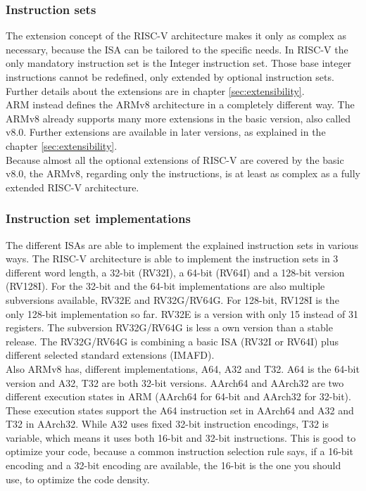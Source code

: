 \documentclass[conference]{IEEEtran}
\begin{document}
	\subsubsection{Instruction sets}
	The extension concept of the RISC-V architecture makes it only as complex as necessary, because the \gls{ISA} can be tailored to the specific needs. In RISC-V the only mandatory instruction set is the Integer instruction set. Those base integer instructions cannot be redefined, only extended by optional instruction sets. \cite{Waterman2017} Further details about the extensions are in chapter \ref{sec:extensibility}. \\
	ARM instead defines the ARMv8 architecture in a completely different way. The ARMv8 already supports many more extensions in the basic version, also called v8.0. Further extensions are available in later versions, as explained in the chapter \ref{sec:extensibility}. \cite{Arm2020} \\
	Because almost all the optional extensions of RISC-V are covered by the basic v8.0, the ARMv8, regarding only the instructions, is at least as complex as a fully extended RISC-V architecture. 
	
	\subsubsection{Instruction set implementations}
	The different \glspl{ISA} are able to implement the explained instruction sets in various ways.
	The RISC-V architecture is able to implement the instruction sets in 3 different word length, a 32-bit (RV32I), a 64-bit (RV64I) and a 128-bit version (RV128I).
	For the 32-bit and the 64-bit implementations are also multiple subversions available, RV32E and RV32G/RV64G. For 128-bit, RV128I is the only 128-bit implementation so far. RV32E is a version with only 15 instead of 31 registers. The subversion RV32G/RV64G is less a own version than a stable release. The RV32G/RV64G is combining a basic \gls{ISA} (RV32I or RV64I) plus different selected standard extensions (IMAFD). \cite{Waterman2016} \\
	Also ARMv8 has, different implementations,
	A64, A32 and T32. A64 is the 64-bit version and A32, T32  are both 32-bit versions.
	AArch64 and AArch32 are two different execution states in ARM (AArch64 for 64-bit and AArch32 for 32-bit). These execution states support the A64 instruction set in AArch64 and A32 and T32 in AArch32. While A32 uses fixed 32-bit instruction encodings, T32 is variable, which means it uses both 16-bit and 32-bit instructions. This is good to optimize your code, because a common instruction selection rule says, if a 16-bit encoding and a 32-bit encoding are available, the 16-bit is the one you should use, to optimize the code density. \cite{Arm2020}\\
	
\end{document}
